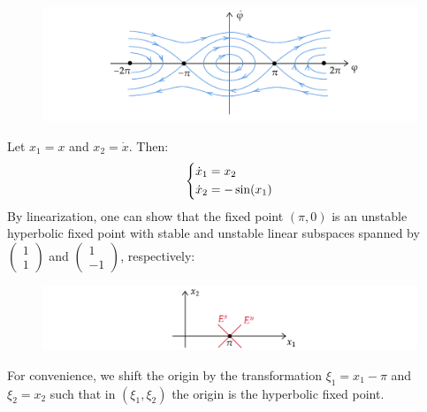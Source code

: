 \begin{solution}[4.2]
\begin{figure}[h]
	\centering
	\includegraphics[scale=0.9]{figures/solutions/ch4/S02D01.pdf}
\end{figure}
Let $x_1 = x$ and $x_2 = \dot{x}$. Then:
\begin{align}
	\begin{dcases}
		\dot{x}_1 = x_2 \\
		\dot{x}_2 = -\sin(x_1)
	\end{dcases}
\end{align}
By linearization, one can show that the fixed point $(\pi, 0)$ is an unstable hyperbolic fixed point with stable and unstable linear subspaces spanned by $\begin{pmatrix} 1 \\ 1 \end{pmatrix}$ and $\begin{pmatrix} 1 \\ -1 \end{pmatrix}$, respectively:
\begin{figure}[h]
	\centering
	\includegraphics[scale=0.9]{figures/solutions/ch4/S02D02.pdf}
\end{figure}
For convenience, we shift the origin by the transformation $\xi_1 = x_1 - \pi$ and $\xi_2 = x_2$ such that in $(\xi_1 , \xi_2)$ the origin is the hyperbolic fixed point.


\end{solution}
